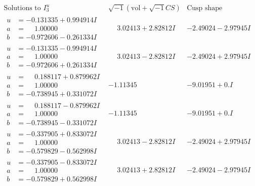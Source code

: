 \documentclass[1p]{elsarticle_modified}
\theoremstyle{definition}
\newcommand{\I}{\sqrt{-1}}
\begin{document}
$$\begin{array}{c|c|c}  
\text{Solutions to }I^u_{3}& \I (\text{vol} + \sqrt{-1}CS) & \text{Cusp shape}\\
 \hline 
\begin{aligned}
u &= -0.131335 + 0.994914 I \\
a &= \phantom{-}1.00000\phantom{ +0.000000I} \\
b &= -0.972606 - 0.261334 I\end{aligned}
 & \phantom{-}3.02413 + 2.82812 I & -2.49024 - 2.97945 I \\ \hline\begin{aligned}
u &= -0.131335 - 0.994914 I \\
a &= \phantom{-}1.00000\phantom{ +0.000000I} \\
b &= -0.972606 + 0.261334 I\end{aligned}
 & \phantom{-}3.02413 - 2.82812 I & -2.49024 + 2.97945 I \\ \hline\begin{aligned}
u &= \phantom{-}0.188117 + 0.879962 I \\
a &= \phantom{-}1.00000\phantom{ +0.000000I} \\
b &= -0.738945 + 0.331072 I\end{aligned}
 & -1.11345\phantom{ +0.000000I} & -9.01951 + 0. I\phantom{ +0.000000I} \\ \hline\begin{aligned}
u &= \phantom{-}0.188117 - 0.879962 I \\
a &= \phantom{-}1.00000\phantom{ +0.000000I} \\
b &= -0.738945 - 0.331072 I\end{aligned}
 & -1.11345\phantom{ +0.000000I} & -9.01951 + 0. I\phantom{ +0.000000I} \\ \hline\begin{aligned}
u &= -0.337905 + 0.833072 I \\
a &= \phantom{-}1.00000\phantom{ +0.000000I} \\
b &= -0.579829 - 0.562998 I\end{aligned}
 & \phantom{-}3.02413 - 2.82812 I & -2.49024 + 2.97945 I \\ \hline\begin{aligned}
u &= -0.337905 - 0.833072 I \\
a &= \phantom{-}1.00000\phantom{ +0.000000I} \\
b &= -0.579829 + 0.562998 I\end{aligned}
 & \phantom{-}3.02413 + 2.82812 I & -2.49024 - 2.97945 I \\ \hline\begin{aligned}

\end{aligned}
\end{array}$$
\end{document}
